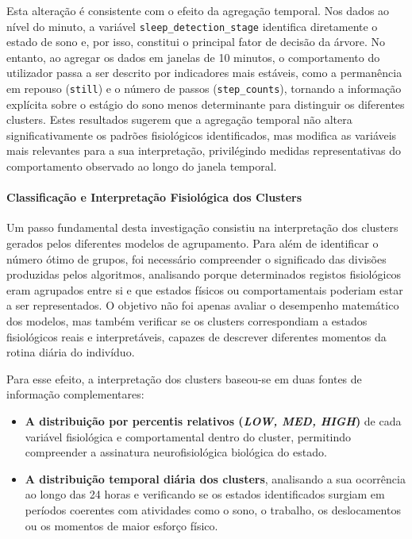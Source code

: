 Esta alteração é consistente com o efeito da agregação temporal. Nos dados ao nível do minuto, a variável \texttt{sleep\_detection\_stage} identifica diretamente o estado de sono e, por isso, constitui o principal fator de decisão da árvore. No entanto, ao agregar os dados em janelas de 10 minutos, o comportamento do utilizador passa a ser descrito por indicadores mais estáveis, como a permanência em repouso (\texttt{still}) e o número de passos (\texttt{step\_counts}), tornando a informação explícita sobre o estágio do sono menos determinante para distinguir os diferentes clusters. Estes resultados sugerem que a agregação temporal não altera significativamente os padrões fisiológicos identificados, mas modifica as variáveis mais relevantes para a sua interpretação, privilégindo medidas representativas do comportamento observado ao longo do janela temporal.

\paragraph{Classificação e Interpretação Fisiológica dos Clusters}

Um passo fundamental desta investigação consistiu na interpretação dos clusters gerados pelos diferentes modelos de agrupamento. Para além de identificar o número ótimo de grupos, foi necessário compreender o significado das divisões produzidas pelos algoritmos, analisando porque determinados registos fisiológicos eram agrupados entre si e que estados físicos ou comportamentais poderiam estar a ser representados. O objetivo não foi apenas avaliar o desempenho matemático dos modelos, mas também verificar se os clusters correspondiam a estados fisiológicos reais e interpretáveis, capazes de descrever diferentes momentos da rotina diária do indivíduo.

Para esse efeito, a interpretação dos clusters baseou-se em duas fontes de informação complementares:
\begin{itemize}
    \item \textbf{A distribuição por percentis relativos (\textit{LOW, MED, HIGH})} de cada variável fisiológica e comportamental dentro do cluster, permitindo compreender a assinatura neurofisiológica biológica do estado.
    \item \textbf{A distribuição temporal diária dos clusters}, analisando a sua ocorrência ao longo das 24 horas e verificando se os estados identificados surgiam em períodos coerentes com atividades como o sono, o trabalho, os deslocamentos ou os momentos de maior esforço físico.
\end{itemize}

